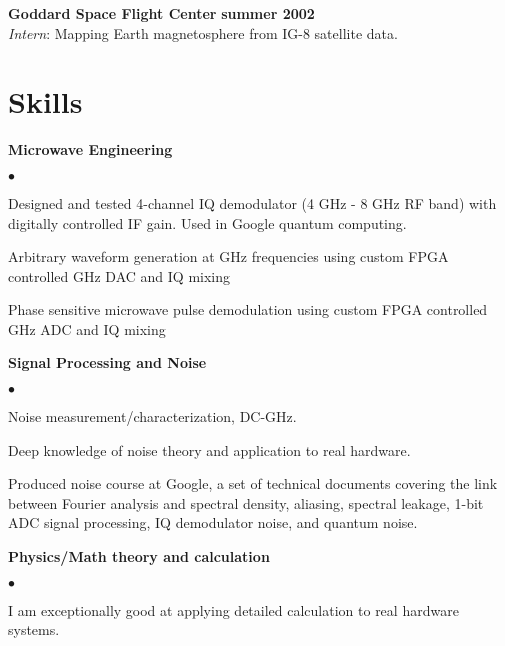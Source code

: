 \documentclass[margin=2cm,line]{res}
\newenvironment{list4}{
  \begin{list}{$\bullet$}{%
      \setlength{\itemsep}{0in}
      \setlength{\parsep}{0in} \setlength{\parskip}{0in}
      \setlength{\topsep}{0in} \setlength{\partopsep}{0in}
      \setlength{\leftmargin}{0.2in}}}{\end{list}}
\newcommand{\job}[4]{
{\bf #1} \hfill {\bf #2}\\
{\em #3}: #4
}
\begin{document}
\begin{resume}
\job
{ Goddard Space Flight Center}
{summer 2002}
{Intern}
{Mapping Earth magnetosphere from IG-8 satellite data.}


\section{\sc Skills}

{\bf Microwave Engineering}\\
\vspace*{-.15in}
\begin{list4}
\item Designed and tested 4-channel IQ demodulator (4 GHz - 8 GHz RF band) with digitally controlled IF gain.
Used in Google quantum computing.
\item Arbitrary waveform generation at GHz frequencies using custom FPGA controlled GHz DAC and IQ mixing
\item Phase sensitive microwave pulse demodulation using custom FPGA controlled GHz ADC and IQ mixing
\end{list4}

{\bf Signal Processing and Noise}\\
\vspace*{-.15in}
\begin{list4}
\item Noise measurement/characterization, DC-GHz.
\item Deep knowledge of noise theory and application to real hardware.
\item Produced noise course at Google, a set of technical documents covering the link between Fourier analysis and spectral density, aliasing, spectral leakage, 1-bit ADC signal processing, IQ demodulator noise, and quantum noise.
\end{list4}

{\bf Physics/Math theory and calculation}\\
\vspace*{-.15in}
\begin{list4}
\item I am exceptionally good at applying detailed calculation to real hardware systems.
\end{list4}

\pagebreak


\end{resume}
\end{document}
